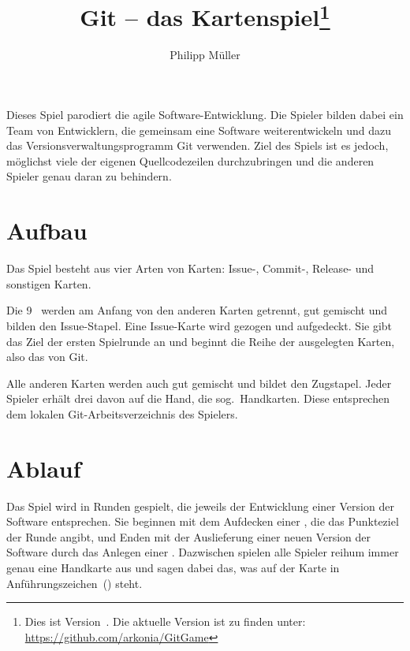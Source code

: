 \documentclass[DIV=15, fontsize=11pt]{gitgame}
\title{Git -- das Kartenspiel\footnote{Dies ist Version~\gitgameversion. Die aktuelle Version ist zu finden unter: \url{https://github.com/arkonia/GitGame}}}
\author{Philipp Müller}
\begin{document}
\maketitle

Dieses Spiel parodiert die agile Software-Entwicklung. Die Spieler bilden dabei ein Team von Entwicklern, die gemeinsam eine Software weiterentwickeln und dazu das Versionsverwaltungsprogramm Git verwenden. Ziel des Spiels ist es jedoch, möglichst viele der eigenen Quellcodezeilen durchzubringen und die anderen Spieler genau daran zu behindern.



\section{Aufbau}
Das Spiel besteht aus vier Arten von Karten: Issue-, Commit-, Release- und sonstigen Karten.


Die 9~ werden am Anfang von den anderen Karten getrennt, gut gemischt und bilden den Issue-Stapel. Eine Issue-Karte wird gezogen und aufgedeckt. Sie gibt das Ziel der ersten Spielrunde an und beginnt die Reihe der ausgelegten Karten, also das  von Git.

Alle anderen Karten werden auch gut gemischt und bildet den Zugstapel. Jeder Spieler erhält drei davon auf die Hand, die sog.\ Handkarten. Diese entsprechen dem lokalen Git-Arbeitsverzeichnis des Spielers.



\section{Ablauf}
Das Spiel wird in Runden gespielt, die jeweils der Entwicklung einer Version der Software entsprechen. Sie beginnen mit dem Aufdecken einer , die das Punkteziel der Runde angibt, und Enden mit der Auslieferung einer neuen Version der Software durch das Anlegen einer . Dazwischen spielen alle Spieler reihum immer genau eine Handkarte aus und sagen dabei das, was auf der Karte in Anführungszeichen~() steht.
\end{document}
